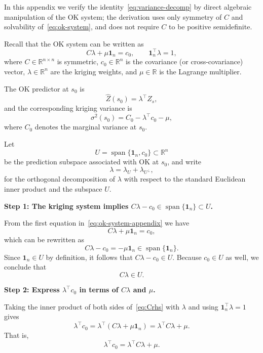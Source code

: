 \documentclass[smallextended]{svjour3}
\newcommand{\1}{\mathbf{1}}
\begin{document}
In this appendix we verify the identity~\eqref{eq:variance-decomp} by direct algebraic manipulation of the OK system; the derivation uses only symmetry of $C$ and solvability of~\eqref{eq:ok-system}, and does not require $C$ to be positive semidefinite.

Recall that the OK system can be written as
\begin{equation}
	\label{eq:ok-system-appendix}
	C\lambda + \mu \mathbf{1}_n = c_0, \qquad \mathbf{1}_n^\top \lambda = 1,
\end{equation}
where $C \in \mathbb{R}^{n\times n}$ is symmetric, $c_0 \in \mathbb{R}^n$ is the covariance (or cross-covariance) vector, $\lambda \in \mathbb{R}^n$ are the kriging weights, and $\mu \in \mathbb{R}$ is the Lagrange multiplier.

The OK predictor at $s_0$ is
\[
\widehat{Z}(s_0) = \lambda^\top Z_s,
\]
and the corresponding kriging variance is
\begin{equation}
	\label{eq:sigma2-appendix}
	\sigma^2(s_0) = C_0 - \lambda^\top c_0 - \mu,
\end{equation}
where $C_0$ denotes the marginal variance at $s_0$.

Let
\[
U = \operatorname{span}\{\mathbf{1}_n,c_0\} \subset \mathbb{R}^n
\]
be the prediction subspace associated with OK at $s_0$, and write
\[
\lambda = \lambda_U + \lambda_{U^\perp},
\]
for the orthogonal decomposition of $\lambda$ with respect to the standard Euclidean inner product and the subspace $U$.

\medskip
\noindent\textbf{Step 1: The kriging system implies $C\lambda - c_0 \in \operatorname{span}\{\mathbf{1}_n\} \subset U$.}

From the first equation in~\eqref{eq:ok-system-appendix} we have
\begin{equation}
	\label{eq:Crhs}
	C\lambda + \mu \mathbf{1}_n = c_0,
\end{equation}
which can be rewritten as
\[
C\lambda - c_0 = -\mu \mathbf{1}_n \in \operatorname{span}\{\mathbf{1}_n\}.
\]
Since $\mathbf{1}_n \in U$ by definition, it follows that $C\lambda - c_0 \in U$. Because $c_0 \in U$ as well, we conclude that
\[
C\lambda \in U.
\]

\medskip
\noindent\textbf{Step 2: Express $\lambda^\top c_0$ in terms of $C\lambda$ and $\mu$.}

Taking the inner product of both sides of~\eqref{eq:Crhs} with $\lambda$ and using $\mathbf{1}_n^\top \lambda = 1$ gives
\[
\lambda^\top c_0
= \lambda^\top (C\lambda + \mu \mathbf{1}_n)
= \lambda^\top C\lambda + \mu.
\]
That is,
\begin{equation}
	\label{eq:lambda-c0-appendix}
	\lambda^\top c_0 = \lambda^\top C\lambda + \mu.
\end{equation}
\end{document}
